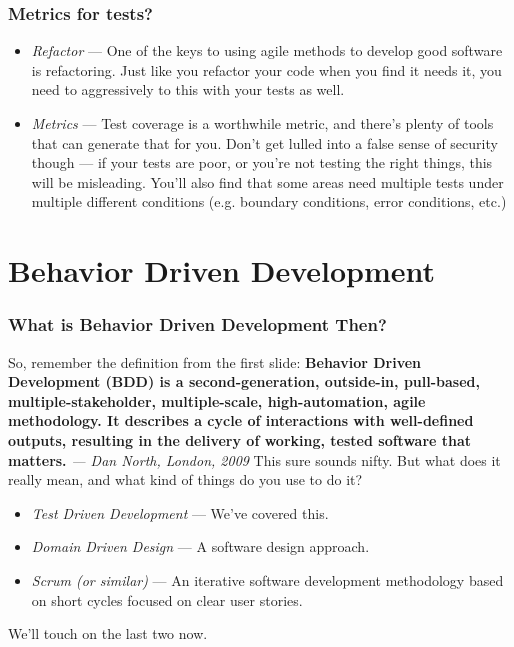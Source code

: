 \documentclass[t, 10pt]{beamer}
\begin{document}
\begin{frame}
\frametitle{Metrics for tests?}
\begin{itemize}
\item \textit{Refactor} --- One of the keys to using agile methods to develop good software is refactoring.  Just like you refactor your code when you find it needs it, you need to aggressively to this with your tests as well.
\item \textit{Metrics} --- Test coverage is a worthwhile metric, and there's plenty of tools that can generate that for you.  Don't get lulled into a false sense of security though --- if your tests are poor, or you're not testing the right things, this will be misleading.  You'll also find that some areas need multiple tests under multiple different conditions (e.g. boundary conditions, error conditions, etc.)
\end{itemize}
\end{frame}

\section{Behavior Driven Development}

\begin{frame}
\frametitle{What is Behavior Driven Development Then?}
So, remember the definition from the first slide:
\textbf{Behavior Driven Development (BDD) is a second-generation, outside-in, pull-based, multiple-stakeholder, multiple-scale, high-automation, agile methodology. It describes a cycle of interactions with well-defined outputs, resulting in the delivery of working, tested software that matters.}
\newline
\textit{--- Dan North, London, 2009}
\newline
\newline
This sure sounds nifty.  But what does it really mean, and what kind of things do you use to do it?
\begin{itemize}
\item \textit{Test Driven Development} --- We've covered this.
\item \textit{Domain Driven Design} --- A software design approach.
\item \textit{Scrum (or similar)} --- An iterative software development methodology based on short cycles focused on clear user stories.
\end{itemize}
We'll touch on the last two now.
\end{frame}
\end{document}
